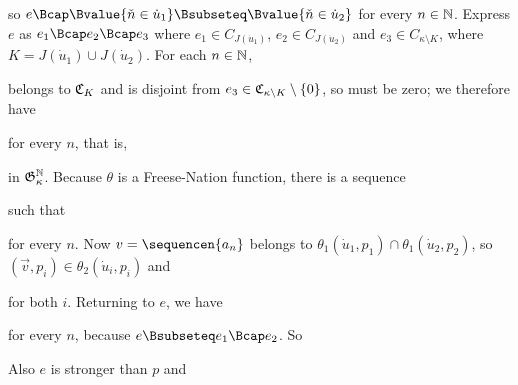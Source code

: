 {

\noindent so
$e\Bcap\Bvalue{\check n\in\dot u_1}\Bsubseteq\Bvalue{\check n\in\dot u_2}$
for every $n\in\Bbb N$.   Express $e$ as $e_1\Bcap e_2\Bcap e_3$ where
$e_1\in C_{J(\dot u_1)}$, $e_2\in C_{J(\dot u_2)}$ and
$e_3\in C_{\kappa\setminus K}$, where $K=J(\dot u_1)\cup J(\dot u_2)$.
For each $n\in\Bbb N$,


\noindent belongs to $\frak C_K$ and is disjoint from
$e_3\in\frak C_{\kappa\setminus K}\setminus\{0\}$, so must be zero;
we therefore have


\noindent for every $n$, that is,


\noindent in $\frak G_{\kappa}^{\Bbb N}$.   Because $\theta$ is a
Freese-Nation function, there is a sequence


\noindent such that


\noindent for every $n$.   Now $v=\sequencen{a_n}$ belongs to
$\theta_1(\dot u_1,p_1)\cap\theta_1(\dot u_2,p_2)$, so
$(\vec v,p_i)\in\theta_2(\dot u_i,p_i)$ and


\noindent for both $i$.   Returning to $e$, we have


\noindent for every $n$, because $e\Bsubseteq e_1\Bcap e_2$.   So


\noindent Also $e$ is stronger than $p$ and

}
